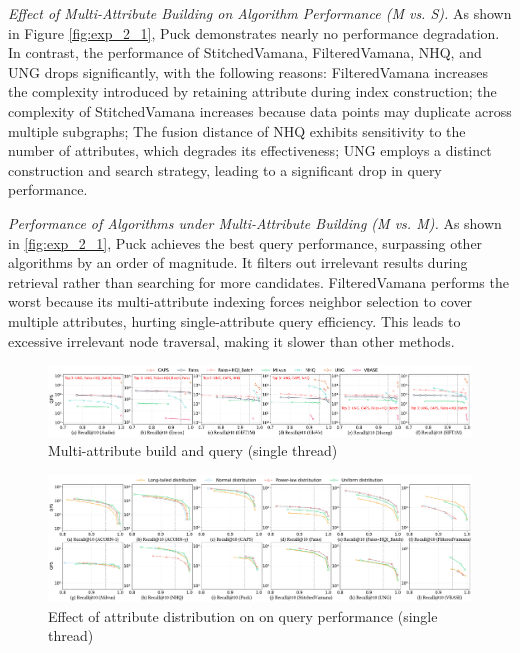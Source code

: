 \documentclass[sigconf, nonacm]{acmart}
\begin{document}
\begin{sloppypar}
\textit{Effect of Multi-Attribute Building on Algorithm Performance (M vs. S).}
As shown in Figure \ref{fig:exp_2_1}, Puck demonstrates nearly no performance degradation. In contrast, the performance of StitchedVamana, FilteredVamana, NHQ, and UNG drops significantly, with the following reasons: FilteredVamana increases the complexity introduced by retaining attribute during index construction; the complexity of StitchedVamana increases because data points may duplicate across multiple subgraphs; The fusion distance of NHQ exhibits sensitivity to the number of attributes, which degrades its effectiveness; UNG employs a distinct construction and search strategy, leading to a significant drop in query performance.



\textit{Performance of Algorithms under Multi-Attribute Building (M vs. M).}  
As shown in \ref{fig:exp_2_1}, Puck achieves the best query performance, surpassing other algorithms by an order of magnitude. It filters out irrelevant results during retrieval rather than searching for more candidates. FilteredVamana performs the worst because its multi-attribute indexing forces neighbor selection to cover multiple attributes, hurting single-attribute query efficiency. This leads to excessive irrelevant node traversal, making it slower than other methods.


\begin{figure}
        \centering
        \setlength{\abovecaptionskip}{0cm}
        \setlength{\belowcaptionskip}{-0.4cm}
        \includegraphics[width=\textwidth]{figures/exp/exp_4_1_MultiLabel_1thread.pdf}
        \caption{Multi-attribute build and query (single thread)}
        \label{fig:exp_4_1_MultiLabel_1thread}
\end{figure}

\begin{figure}
        \centering
        \setlength{\abovecaptionskip}{0cm}
        \setlength{\belowcaptionskip}{-0.4cm}
        \includegraphics[width=\textwidth]{figures/exp/exp_3_1.pdf}
        \caption{Effect of attribute distribution on on query performance (single thread)}
        \label{fig:exp_3_1}
\end{figure}






\end{sloppypar}
\end{document}
